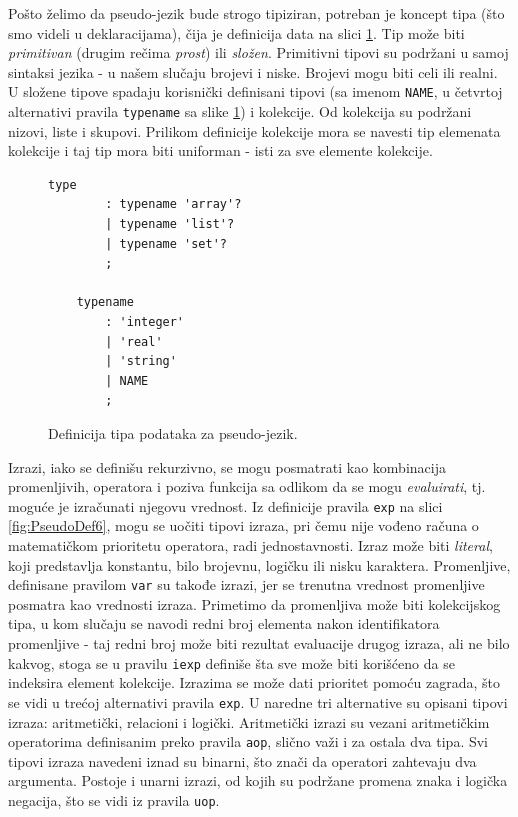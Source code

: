 Pošto želimo da pseudo-jezik bude strogo tipiziran, potreban je koncept tipa (što smo videli u deklaracijama), čija je definicija data na slici \ref{fig:PseudoDef5}. Tip može biti \emph{primitivan} (drugim rečima \emph{prost}) ili \emph{složen}. Primitivni tipovi su podržani u samoj sintaksi jezika - u našem slučaju brojevi i niske. Brojevi mogu biti celi ili realni. U složene tipove spadaju korisnički definisani tipovi (sa imenom \texttt{NAME}, u četvrtoj alternativi pravila \texttt{typename} sa slike \ref{fig:PseudoDef5}) i kolekcije. Od kolekcija su podržani nizovi, liste i skupovi. Prilikom definicije kolekcije mora se navesti tip elemenata kolekcije i taj tip mora biti uniforman - isti za sve elemente kolekcije. 

\begin{figure}[h!]
    \begin{lstlisting}[language={}]
    type 
        : typename 'array'?
        | typename 'list'?
        | typename 'set'?
        ;

    typename 
        : 'integer' 
        | 'real' 
        | 'string' 
        | NAME 
        ;
    \end{lstlisting}
    \caption{Definicija tipa podataka za pseudo-jezik.}
    \label{fig:PseudoDef5}
\end{figure}

Izrazi, iako se definišu rekurzivno, se mogu posmatrati kao kombinacija promenljivih, operatora i poziva funkcija sa odlikom da se mogu \emph{evaluirati}, tj. moguće je izračunati njegovu vrednost. Iz definicije pravila \texttt{exp} na slici \ref{fig:PseudoDef6}, mogu se uočiti tipovi izraza, pri čemu nije vođeno računa o matematičkom prioritetu operatora, radi jednostavnosti. Izraz može biti \emph{literal}, koji predstavlja konstantu, bilo brojevnu, logičku ili nisku karaktera. Promenljive, definisane pravilom \texttt{var} su takođe izrazi, jer se trenutna vrednost promenljive posmatra kao vrednosti izraza. Primetimo da promenljiva može biti kolekcijskog tipa, u kom slučaju se navodi redni broj elementa nakon identifikatora promenljive - taj redni broj može biti rezultat evaluacije drugog izraza, ali ne bilo kakvog, stoga se u pravilu \texttt{iexp} definiše šta sve može biti korišćeno da se indeksira element kolekcije. Izrazima se može dati prioritet pomoću zagrada, što se vidi u trećoj alternativi pravila \texttt{exp}. U naredne tri alternative su opisani tipovi izraza: aritmetički, relacioni i logički. Aritmetički izrazi su vezani aritmetičkim operatorima definisanim preko pravila \texttt{aop}, slično važi i za ostala dva tipa. Svi tipovi izraza navedeni iznad su binarni, što znači da operatori zahtevaju dva argumenta. Postoje i unarni izrazi, od kojih su podržane promena znaka i logička negacija, što se vidi iz pravila \texttt{uop}.

